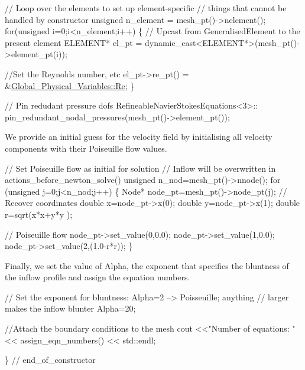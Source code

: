 \begin{DoxyCodeInclude}

 \textcolor{comment}{// Loop over the elements to set up element-specific }
 \textcolor{comment}{// things that cannot be handled by constructor}
 \textcolor{keywordtype}{unsigned} n\_element = mesh\_pt()->nelement();
 \textcolor{keywordflow}{for}(\textcolor{keywordtype}{unsigned} i=0;i<n\_element;i++)
  \{
   \textcolor{comment}{// Upcast from GeneralisedElement to the present element}
   ELEMENT* el\_pt = \textcolor{keyword}{dynamic\_cast<}ELEMENT*\textcolor{keyword}{>}(mesh\_pt()->element\_pt(i));

   \textcolor{comment}{//Set the Reynolds number, etc}
   el\_pt->re\_pt() = &\hyperlink{namespaceGlobal__Physical__Variables_ab814e627d2eb5bc50318879d19ab16b9}{Global\_Physical\_Variables::Re};
  \}

 \textcolor{comment}{// Pin redudant pressure dofs}
 RefineableNavierStokesEquations<3>::
  pin\_redundant\_nodal\_pressures(mesh\_pt()->element\_pt());

\end{DoxyCodeInclude}


We provide an initial guess for the velocity field by initialising all velocity components with their Poiseuille flow values.


\begin{DoxyCodeInclude}

 \textcolor{comment}{// Set Poiseuille flow as initial for solution}
 \textcolor{comment}{// Inflow will be overwritten in actions\_before\_newton\_solve()}
 \textcolor{keywordtype}{unsigned} n\_nod=mesh\_pt()->nnode();
 \textcolor{keywordflow}{for} (\textcolor{keywordtype}{unsigned} j=0;j<n\_nod;j++)
  \{
   Node* node\_pt=mesh\_pt()->node\_pt(j);
   \textcolor{comment}{// Recover coordinates}
   \textcolor{keywordtype}{double} x=node\_pt->x(0);
   \textcolor{keywordtype}{double} y=node\_pt->x(1);
   \textcolor{keywordtype}{double} r=sqrt(x*x+y*y );  
   
   \textcolor{comment}{// Poiseuille flow}
   node\_pt->set\_value(0,0.0);
   node\_pt->set\_value(1,0.0);
   node\_pt->set\_value(2,(1.0-r*r));
  \}

\end{DoxyCodeInclude}


Finally, we set the value of {\ttfamily Alpha}, the exponent that specifies the bluntness of the inflow profile and assign the equation numbers.


\begin{DoxyCodeInclude}

 \textcolor{comment}{// Set the exponent for bluntness: Alpha=2 --> Poisseuille; anything}
 \textcolor{comment}{// larger makes the inflow blunter}
 Alpha=20;

 \textcolor{comment}{//Attach the boundary conditions to the mesh}
 cout <<\textcolor{stringliteral}{"Number of equations: "} << assign\_eqn\_numbers() << std::endl; 

\} \textcolor{comment}{// end\_of\_constructor}

\end{DoxyCodeInclude}




